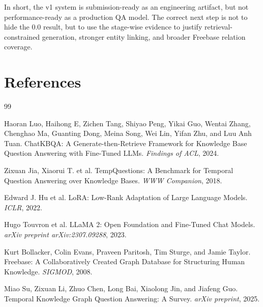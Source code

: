 \documentclass[a4paper,11pt]{article}
\begin{document}
\noindent In short, the v1 system is submission-ready as an engineering artifact, but not performance-ready as a production QA model. The correct next step is not to hide the 0.0 result, but to use the stage-wise evidence to justify retrieval-constrained generation, stronger entity linking, and broader Freebase relation coverage.

\section{References}

\begin{thebibliography}{99}

Haoran Luo, Haihong E, Zichen Tang, Shiyao Peng, Yikai Guo, Wentai Zhang, Chenghao Ma, Guanting Dong, Meina Song, Wei Lin, Yifan Zhu, and Luu Anh Tuan.
\newblock ChatKBQA: A Generate-then-Retrieve Framework for Knowledge Base Question Answering with Fine-Tuned LLMs.
\newblock \emph{Findings of ACL}, 2024.

Zixuan Jia, Xiaorui T. et al.
\newblock TempQuestions: A Benchmark for Temporal Question Answering over Knowledge Bases.
\newblock \emph{WWW Companion}, 2018.

Edward J. Hu et al.
\newblock LoRA: Low-Rank Adaptation of Large Language Models.
\newblock \emph{ICLR}, 2022.

Hugo Touvron et al.
\newblock LLaMA 2: Open Foundation and Fine-Tuned Chat Models.
\newblock \emph{arXiv preprint arXiv:2307.09288}, 2023.

Kurt Bollacker, Colin Evans, Praveen Paritosh, Tim Sturge, and Jamie Taylor.
\newblock Freebase: A Collaboratively Created Graph Database for Structuring Human Knowledge.
\newblock \emph{SIGMOD}, 2008.

Miao Su, Zixuan Li, Zhuo Chen, Long Bai, Xiaolong Jin, and Jiafeng Guo.
\newblock Temporal Knowledge Graph Question Answering: A Survey.
\newblock \emph{arXiv preprint}, 2025.

\end{thebibliography}
\end{document}
